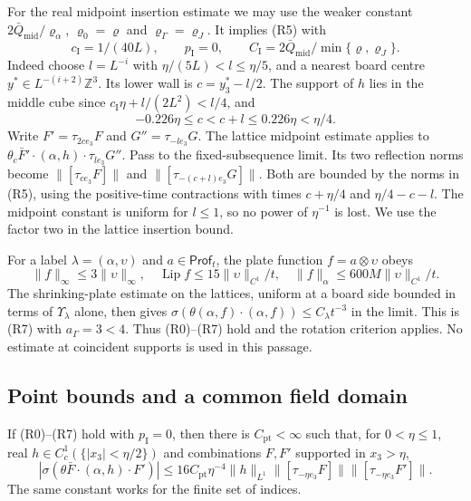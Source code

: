 \documentclass[11pt,letterpaper,reqno]{amsart}
\makeatletter
\theoremstyle{definition}
\newcommand{\ms@minorstart}{%
  \pushQED{\qed}\renewcommand{\qedsymbol}{$\blacksquare$}}
\newenvironment{proposition}[1][]{\ms@minorstart\ms@proposition[#1]}
  {\popQED\endms@proposition}
\theoremstyle{remark}
\makeatother
\begin{document}
For the real midpoint insertion estimate we may use
the weaker constant
$2\bar Q_{\mathrm{mid}}/\varrho_\alpha$,
$\varrho_0=\varrho$ and
$\varrho_\Gamma=\varrho_J$.
It implies (R5) with
\[
 c_{\mathrm I}=1/(40L),\qquad p_{\mathrm I}=0,
 \qquad C_{\mathrm I}=
            2\bar Q_{\mathrm{mid}}/\min\{\varrho,\varrho_J\}.
\]
Indeed choose $l=L^{-i}$ with
$\eta/(5L)<l\le\eta/5$, and a nearest board centre
$y^*\in L^{-(i+2)}\mathbb Z^3$.  Its lower wall is
$c=y_3^*-l/2$.  The support of $h$ lies in the
middle cube since
$c_{\mathrm I}\eta+l/(2L^2)<l/4$, and
\[
 -0.226\eta\le c<c+l\le0.226\eta<\eta/4.
\]
Write $F'=\tau_{2ce_3}F$ and
$G''=\tau_{-le_3}G$.  The lattice midpoint
estimate applies to
$\theta_c\bar F'\cdot(\alpha,h)\cdot\tau_{le_3}G''$.
Pass to the fixed-subsequence limit.  Its two
reflection norms become
$\|[\tau_{ce_3}F]\|$ and
$\|[\tau_{-(c+l)e_3}G]\|$.
Both are bounded by the norms in (R5), using
the positive-time contractions with times
$c+\eta/4$ and $\eta/4-c-l$.
The midpoint constant is uniform for $l\le1$,
so no power of $\eta^{-1}$ is lost.  We use the
factor two in the lattice insertion bound.

For a label $\lambda=(\alpha,\upsilon)$ and
$a\in\mathsf{Prof}_t$, the plate function
$f=a\otimes\upsilon$ obeys
\[
 \|f\|_\infty\le3\|\upsilon\|_\infty,
 \quad \operatorname{Lip}f\le15\|\upsilon\|_{C^1}/t,
 \quad \|f\|_\alpha\le600M\|\upsilon\|_{C^1}/t.
\]
The shrinking-plate estimate on the lattices,
uniform at a board side bounded in terms of
$\Upsilon_\lambda$ alone, then gives
$\sigma(\theta(\alpha,f)\cdot(\alpha,f))
\le C_\lambda t^{-3}$ in the limit.
This is (R7) with $a_\Gamma=3<4$.
Thus (R0)--(R7) hold and the rotation criterion applies.
No estimate at coincident supports
is used in this passage.

\subsection{Point bounds and a common field domain}

\begin{proposition}[An $L^1$ point bound]\label{C-389-33}
If (R0)--(R7) hold with $p_{\mathrm I}=0$, then there
is $C_{\mathrm{pt}}<\infty$ such that, for
$0<\eta\le1$, real $h\in C_c^1(\{|x_3|<\eta/2\})$
and combinations $F,F'$ supported in $x_3>\eta$,
\[
 |\sigma(\theta\bar F\cdot(\alpha,h)\cdot F')|
 \le16C_{\mathrm{pt}}\eta^{-4}\|h\|_{L^1}
 \|[\tau_{-\eta e_3}F]\|
 \|[\tau_{-\eta e_3}F']\|.
\]
The same constant works for the finite set of indices.
\end{proposition}
\end{document}
